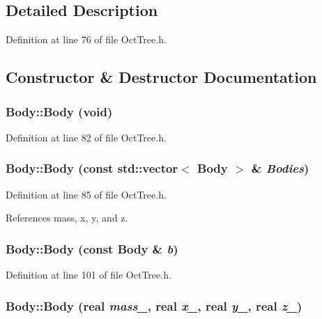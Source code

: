 \subsection{Detailed Description}


Definition at line 76 of file OctTree.h.



\subsection{Constructor \& Destructor Documentation}
\subsubsection[{Body}]{\setlength{\rightskip}{0pt plus 5cm}Body::Body (void)}\label{classBody_a9bcca1c329e0c0eac2deaf806067265e}


Definition at line 82 of file OctTree.h.

\subsubsection[{Body}]{\setlength{\rightskip}{0pt plus 5cm}Body::Body (const std::vector$<$ {\bf Body} $>$ \& {\em Bodies})}\label{classBody_a7c5392107a6a4eefb235e5d084327706}


Definition at line 85 of file OctTree.h.



References mass, x, y, and z.

\subsubsection[{Body}]{\setlength{\rightskip}{0pt plus 5cm}Body::Body (const {\bf Body} \& {\em b})}\label{classBody_af910bd227d2efa484235644b86fa5591}


Definition at line 101 of file OctTree.h.

\subsubsection[{Body}]{\setlength{\rightskip}{0pt plus 5cm}Body::Body ({\bf real} {\em mass\_\-}, \/  {\bf real} {\em x\_\-}, \/  {\bf real} {\em y\_\-}, \/  {\bf real} {\em z\_\-})}\label{classBody_a2ec20fbc569b44d03f14927f3d370fac}


